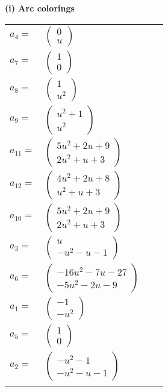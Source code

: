 \documentclass[1p]{elsarticle_modified}
\theoremstyle{definition}
\begin{document}
\flushleft \textbf{(i) Arc colorings}\\
\begin{tabular}{m{7pt} m{180pt} m{7pt} m{180pt} }
\flushright $a_{4}=$&$\begin{pmatrix}0\\u\end{pmatrix}$ \\
\flushright $a_{7}=$&$\begin{pmatrix}1\\0\end{pmatrix}$ \\
\flushright $a_{8}=$&$\begin{pmatrix}1\\u^2\end{pmatrix}$ \\
\flushright $a_{9}=$&$\begin{pmatrix}u^2+1\\u^2\end{pmatrix}$ \\
\flushright $a_{11}=$&$\begin{pmatrix}5 u^2+2 u+9\\2 u^2+u+3\end{pmatrix}$ \\
\flushright $a_{12}=$&$\begin{pmatrix}4 u^2+2 u+8\\u^2+u+3\end{pmatrix}$ \\
\flushright $a_{10}=$&$\begin{pmatrix}5 u^2+2 u+9\\2 u^2+u+3\end{pmatrix}$ \\
\flushright $a_{3}=$&$\begin{pmatrix}u\\- u^2- u-1\end{pmatrix}$ \\
\flushright $a_{6}=$&$\begin{pmatrix}-16 u^2-7 u-27\\-5 u^2-2 u-9\end{pmatrix}$ \\
\flushright $a_{1}=$&$\begin{pmatrix}-1\\- u^2\end{pmatrix}$ \\
\flushright $a_{5}=$&$\begin{pmatrix}1\\0\end{pmatrix}$ \\
\flushright $a_{2}=$&$\begin{pmatrix}- u^2-1\\- u^2- u-1\end{pmatrix}$\\&\end{tabular}
\end{document}

